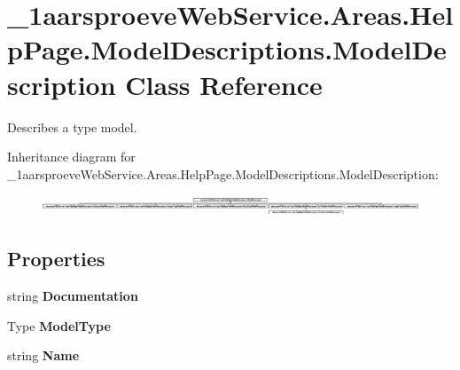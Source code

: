 \hypertarget{class__1aarsproeve_web_service_1_1_areas_1_1_help_page_1_1_model_descriptions_1_1_model_description}{}\section{\+\_\+1aarsproeve\+Web\+Service.\+Areas.\+Help\+Page.\+Model\+Descriptions.\+Model\+Description Class Reference}
\label{class__1aarsproeve_web_service_1_1_areas_1_1_help_page_1_1_model_descriptions_1_1_model_description}


Describes a type model.  


Inheritance diagram for \+\_\+1aarsproeve\+Web\+Service.\+Areas.\+Help\+Page.\+Model\+Descriptions.\+Model\+Description\+:\begin{figure}[H]
\begin{center}
\leavevmode
\includegraphics[height=0.605405cm]{class__1aarsproeve_web_service_1_1_areas_1_1_help_page_1_1_model_descriptions_1_1_model_description}
\end{center}
\end{figure}
\subsection*{Properties}
\begin{DoxyCompactItemize}
\item 
\hypertarget{class__1aarsproeve_web_service_1_1_areas_1_1_help_page_1_1_model_descriptions_1_1_model_description_ac4829682ab8e3a3dd80316cecbf26005}{}string {\bfseries Documentation}\label{class__1aarsproeve_web_service_1_1_areas_1_1_help_page_1_1_model_descriptions_1_1_model_description_ac4829682ab8e3a3dd80316cecbf26005}

\item 
\hypertarget{class__1aarsproeve_web_service_1_1_areas_1_1_help_page_1_1_model_descriptions_1_1_model_description_a33288a937777275fb9acd1b2befdf541}{}Type {\bfseries Model\+Type}\label{class__1aarsproeve_web_service_1_1_areas_1_1_help_page_1_1_model_descriptions_1_1_model_description_a33288a937777275fb9acd1b2befdf541}

\item 
\hypertarget{class__1aarsproeve_web_service_1_1_areas_1_1_help_page_1_1_model_descriptions_1_1_model_description_ae243f1257accc1f9e2809fc21dccad60}{}string {\bfseries Name}\label{class__1aarsproeve_web_service_1_1_areas_1_1_help_page_1_1_model_descriptions_1_1_model_description_ae243f1257accc1f9e2809fc21dccad60}

\end{DoxyCompactItemize}


